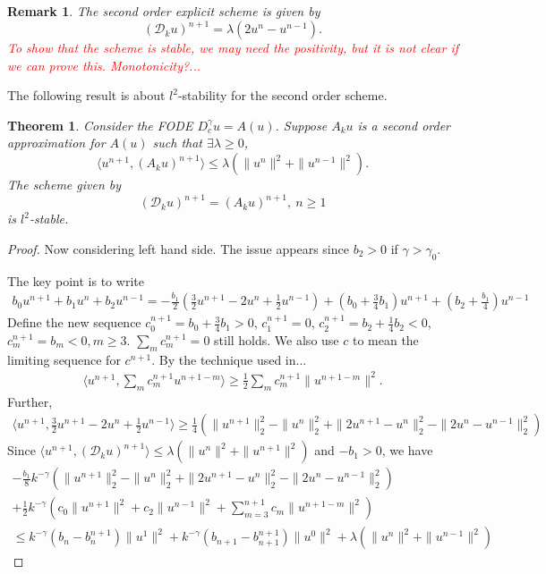 \documentclass[11pt]{article}
\newcommand{\tcr}[1]{\textcolor{red}{#1}}
\newtheorem{thm}{Theorem}
\newtheorem{rmk}{Remark}
\begin{document}
\begin{rmk}
The second order explicit scheme is given by $$
(\mathcal{D}_ku)^{n+1}=\lambda(2u^n-u^{n-1}).
$$
\tcr{To show that the scheme is stable, we may need the positivity, but it is not clear if we can prove this. Monotonicity?...}
\end{rmk}

The following result is about $l^2$-stability for the second order scheme.
\begin{thm}
Consider the FODE $D_c^{\gamma}u=A(u)$. Suppose $A_ku$ is a second order approximation for $A(u)$ such that $\exists\lambda\ge 0$, $$
\langle u^{n+1}, (A_ku)^{n+1}\rangle \le \lambda(\|u^{n}\|^2+\|u^{n-1}\|^2).
$$
The scheme given by
$$
(\mathcal{D}_ku)^{n+1}=(A_ku)^{n+1}, \ n\ge 1
$$
is $l^2$-stable.
\end{thm}
\begin{proof}

Now considering left hand side. The issue appears since $b_2>0$ if $\gamma>\gamma_0$.

The key point is to write 
\begin{gather*}
b_0u^{n+1}+b_1u^n+b_2u^{n-1}
=-\frac{b_1}{2}(\frac{3}{2}u^{n+1}-2u^n+\frac{1}{2}u^{n-1})
+(b_0+\frac{3}{4}b_1)u^{n+1}+(b_2+\frac{b_1}{4})u^{n-1}
\end{gather*}
Define the new sequence $c_0^{n+1}=b_0+\frac{3}{4}b_1>0$, $c_1^{n+1}=0$,
$c_2^{n+1}=b_2+\frac{1}{4}b_2<0$, $c_m^{n+1}=b_m<0, m\ge 3$. $\sum_m c_m^{n+1}=0$ still holds. We also use $c$ to mean the limiting sequence for $c^{n+1}$. By the technique used in...
\begin{gather*}
\langle u^{n+1}, \sum_m c_m^{n+1}u^{n+1-m}\rangle\ge 
\frac{1}{2}\sum_m c_m^{n+1}\|u^{n+1-m}\|^2.
\end{gather*}
Further, 
\begin{multline*}
\langle u^{n+1}, \frac{3}{2}u^{n+1}-2u^n+\frac{1}{2}u^{n-1}\rangle
\ge \frac{1}{4}(\|u^{n+1}\|_2^2-\|u^n\|_2^2+\|2u^{n+1}-u^n\|_2^2-\|2u^n-u^{n-1}\|_2^2)
\end{multline*}
Since $\langle u^{n+1}, (\mathcal{D}_k u)^{n+1}\rangle\le \lambda(\|u^n\|^2+\|u^{n+1}\|^2)$ and $-b_1>0$, we have
\begin{multline*}
-\frac{b_1}{8}k^{-\gamma}(\|u^{n+1}\|_2^2-\|u^n\|_2^2+\|2u^{n+1}-u^n\|_2^2-\|2u^n-u^{n-1}\|_2^2)\\
+\frac{1}{2}k^{-\gamma}\left(c_0\|u^{n+1}\|^2
+c_2\|u^{n-1}\|^2
+\sum_{m=3}^{n+1}c_m\|u^{n+1-m}\|^2\right)\\
\le k^{-\gamma}(b_{n}-b^{n+1}_n)\|u^1\|^2
+k^{-\gamma}(b_{n+1}-b_{n+1}^{n+1})\|u^0\|^2+\lambda(\|u^n\|^2+\|u^{n-1}\|^2)
\end{multline*}


\end{proof}
\end{document}
